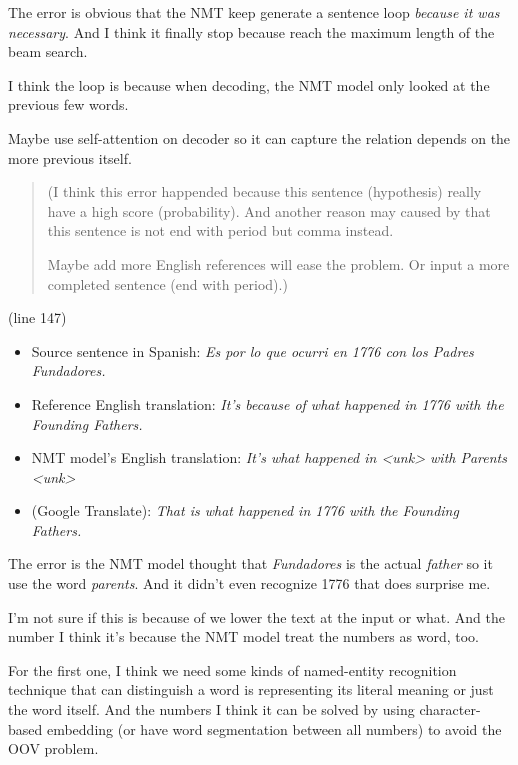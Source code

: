 \documentclass[12pt, letterpaper]{article}
\begin{document}
The error is obvious that the NMT keep generate a sentence loop \textit{because it was necessary}. And I think it finally stop because reach the maximum length of the beam search.

I think the loop is because when decoding, the NMT model only looked at the previous few words.

Maybe use self-attention on decoder so it can capture the relation depends on the more previous itself.

\begin{quote}
(I think this error happended because this sentence (hypothesis) really have a high score (probability). And another reason may caused by that this sentence is not end with period but comma instead.

Maybe add more English references will ease the problem. Or input a more completed sentence (end with period).)
\end{quote}

\bigskip

\noindent(line 147)

\begin{itemize}
  \item Source sentence in Spanish: \textit{Es por lo que ocurri en 1776 con los Padres Fundadores.}
  \item Reference English translation: \textit{It's because of what happened in 1776  with the Founding Fathers.}
  \item NMT model's English translation: \textit{It's what happened in <unk> with Parents <unk>}
  \item (Google Translate): \textit{That is what happened in 1776 with the Founding Fathers.}
\end{itemize}

The error is the NMT model thought that \textit{Fundadores} is the actual \textit{father} so it use the word \textit{parents}. And it didn't even recognize 1776 that does surprise me.

I'm not sure if this is because of we lower the text at the input or what. And the number I think it's because the NMT model treat the numbers as word, too.

For the first one, I think we need some kinds of named-entity recognition technique that can distinguish a word is representing its literal meaning or just the word itself. And the numbers I think it can be solved by using character-based embedding (or have word segmentation between all numbers) to avoid the OOV problem.
\end{document}
